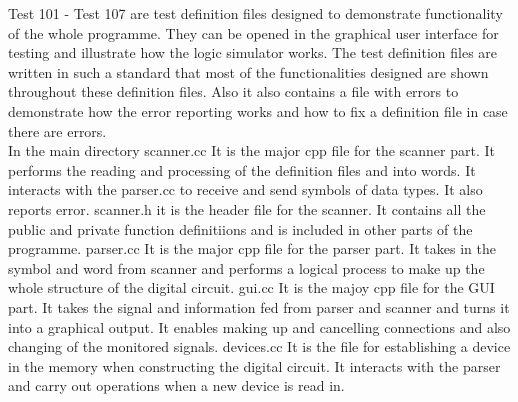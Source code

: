 \documentclass[12pt]{article}
\begin{document}
Test 101 - Test 107 are test definition files designed to demonstrate functionality of the whole programme. They can be opened 
in the graphical user interface for testing and illustrate how the logic simulator works. The test definition files are written
 in such a standard that most of the functionalities designed are shown throughout these definition files. Also it also contains
 a file with errors to demonstrate how the error reporting works and how to fix a definition file in case there are errors.\\
 
In the main directory 
scanner.cc It is the major cpp file for the scanner part. It performs the reading and processing of the definition files and into
 words. It interacts with the parser.cc to receive and send symbols of data types. It also reports error.
scanner.h it is the header file for the scanner. It contains all the public and private function definitiions and is included in 
other parts of the programme.
parser.cc It is the major cpp file for the parser part. It takes in the symbol and word from scanner and performs a logical process
to make up the whole structure of the digital circuit.
gui.cc It is the majoy cpp file for the GUI part. It takes the signal and information fed from parser and scanner and turns it into 
a graphical output. It enables making up and cancelling connections and also changing of the monitored signals.
devices.cc It is the file for establishing a device in the memory when constructing the digital circuit. It interacts with the parser
and carry out operations when a new device is read in.
\end{document}
